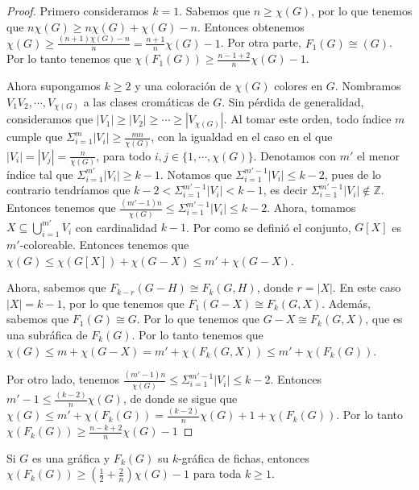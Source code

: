         \begin{proof}
        Primero consideramos $k=1$. Sabemos que $n \geq \chi(G)$, por lo que
        tenemos que $n\chi(G) \geq n\chi(G) + \chi(G) -n$. Entonces obtenemos
        $\chi (G) \geq \frac{(n+1)\chi(G)-n}{n} = \frac{n+1}{n}\chi (G) -1$.
        Por otra parte, $F_1(G) \cong (G)$. Por lo tanto tenemos que
        $\chi(F_1(G)) \geq \frac{n-1+2}{n} \chi(G) -1$.
        
            Ahora supongamos $k \geq 2$ y una coloraci\'on de $\chi(G)$ colores
            en $G$. Nombramos $V_1 V_2, \cdots, V_{\chi(G)}$ a las clases
            crom\'aticas de $G$. Sin p\'erdida de generalidad, consideramos que
            $|V_1|\geq |V_2|\geq \cdots \geq |V_{\chi(G)}|$. Al tomar este
            orden, todo \'indice $m$ cumple que $\Sigma_{i=1}^{m}|V_i| \geq
            \frac{mn}{\chi(G)}$, con la igualdad en el caso en el que $|V_i| =
            |V_j| = \frac{n}{\chi(G)}$, para todo $i,j \in \{1, \cdots,
            \chi(G)\}$. Denotamos con $m'$ el menor \'indice tal que
            $\Sigma_{i=1}^{m'}|V_i| \geq k-1$. Notamos que
            $\Sigma_{i=1}^{m'-1}|V_i| \leq k-2$, pues de lo contrario
            tendr\'iamos que $k-2<\Sigma_{i=1}^{m'-1}|V_i| < k-1$, es decir
            $\Sigma_{i=1}^{m'-1}|V_i| \notin \mathbb{Z}$. Entonces tenemos que
            $\frac{(m'-1)n}{\chi(G)}\leq \Sigma_{i=1}^{m'-1}|V_i| \leq k-2$.
            Ahora, tomamos $X \subseteq \bigcup_{i=1}^{m'} V_i$ con cardinalidad
            $k-1$. Por como se defini\'o el conjunto, $G[X]$ es $m'$-coloreable.
            Entonces tenemos que  $\chi(G) \leq \chi(G[X])+\chi(G-X) \leq m' +
            \chi(G-X)$.
        
            Ahora, sabemos que $F_{k-r}(G-H) \cong F_k(G,H)$, donde $r = |X|$.
            En este caso $|X| = k-1$, por lo que tenemos que $F_1(G-X) \cong
            F_k(G,X)$. Adem\'as, sabemos que $F_1(G) \cong G$. Por lo que
            tenemos que $G-X \cong F_k(G,X)$, que es una subr\'afica de
            $F_k(G)$. Por lo tanto tenemos que $\chi(G) \leq m + \chi(G-X) = m'
            + \chi(F_k(G,X)) \leq m' + \chi(F_k(G))$. 
            
            Por otro lado, tenemos $\frac{(m'-1)n}{\chi(G)}\leq
            \Sigma_{i=1}^{m'-1}|V_i| \leq k-2$. Entonces $m'-1 \leq
            \frac{(k-2)}{n}\chi(G)$, de donde se sigue que $\chi(G) \leq m' +
            \chi(F_k(G)) = \frac{(k-2)}{n}\chi(G) +1 + \chi(F_k(G))$. Por lo
            tanto $\chi(F_k(G)) \geq \frac{n-k+2}{n} \chi(G) -1$
        \end{proof}
    \begin{teorema}
    \label{relacion num cromatico indep k}
        Si $G$ es una gr\'afica y $F_k(G)$ su $k$-gr\'afica de fichas, entonces
        $\chi (F_k(G)) \geq (\frac{1}{2}+ \frac{2}{n})\chi(G) -1 $ para toda $k
        \geq 1$.
    \end{teorema}
    

